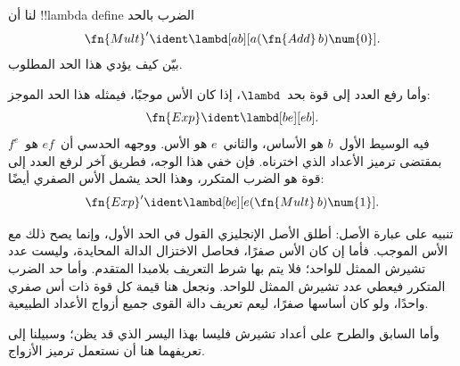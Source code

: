 \documentclass[../../../include/open-logic-section]{subfiles}
\begin{document}
\begin{prob}
لنا أن !!{lambda define} الضرب بالحد
\[
  \fn{Mult}' \ident \lambd[ab][a (\fn{Add}\, b) \num{0}].
\]
بيّن كيف يؤدي هذا الحد المطلوب.
\end{prob}

وأما رفع العدد إلى قوة بحد~$\lambd$، إذا كان الأس موجبًا، فيمثله هذا الحد الموجز:
\[
  \fn{Exp} \ident \lambd[be][e b].
\]
فيه الوسيط الأول~$b$ هو الأساس، والثاني~$e$ هو الأس.
ووجهه الحدسي أن~$e f$ هو~$f^e$ بمقتضى ترميز الأعداد الذي اخترناه.
فإن خفي هذا الوجه، فطريق آخر لرفع العدد إلى قوة هو الضرب المتكرر،
وهذا الحد يشمل الأس الصفري أيضًا:
\[
  \fn{Exp}' \ident \lambd[be][e (\fn{Mult}\, b) \num{1}].
\]

تنبيه على عبارة الأصل: أطلق الأصل الإنجليزي القول في الحد الأول،
وإنما يصح ذلك مع الأس الموجب. فأما إن كان الأس صفرًا، فحاصل الاختزال
الدالة المحايدة، وليست عدد تشيرش الممثل للواحد؛ فلا يتم بها شرط
التعريف بلامبدا المتقدم. وأما حد الضرب المتكرر فيعطي عدد تشيرش
الممثل للواحد. ونجعل هنا قيمة كل قوة ذات أس صفري واحدًا، ولو كان
أساسها صفرًا، ليعم تعريف دالة القوى جميع أزواج الأعداد الطبيعية.

وأما السابق والطرح على أعداد تشيرش فليسا بهذا اليسر الذي قد يظن؛
وسبيلنا إلى تعريفهما هنا أن نستعمل ترميز الأزواج.
\end{document}
